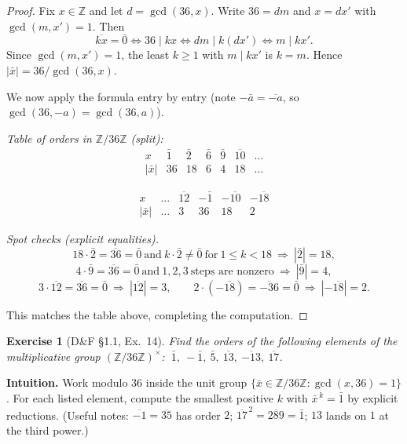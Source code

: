 \documentclass[12pt]{article}
\newtheorem{exercise}[theorem]{Exercise}
\theoremstyle{definition}
\begin{document}
\dotfill

\begin{proof}
Fix $x\in\mathbb{Z}$ and let $d=\gcd(36,x)$. Write $36=dm$ and $x=dx'$ with $\gcd(m,x')=1$.
Then
\[
\overline{kx}=\bar 0 \iff 36\mid kx \iff dm\mid k(dx') \iff m\mid kx'.
\]
Since $\gcd(m,x')=1$, the least $k\ge 1$ with $m\mid kx'$ is $k=m$. Hence $|\bar x|=36/\gcd(36,x)$.

We now apply the formula entry by entry (note $-\bar a=\overline{-a}$, so $\gcd(36,-a)=\gcd(36,a)$).

\dotfill

\noindent\emph{Table of orders in $\mathbb{Z}/36\mathbb{Z}$ (split):}
\[
\begin{array}{c|cccccc}
x & \bar 1 & \bar 2 & \bar 6 & \bar 9 & \overline{10} & \text{...} \\
\hline
|\bar x| & 36 & 18 & 6 & 4 & 18 & \text{...}
\end{array}
\]

\[
\begin{array}{c|ccccc}
x & \text{...} & \overline{12} & -\bar 1 & -\overline{10} & -\overline{18} \\
\hline
|\bar x| & \text{...} & 3 & 36 & 18 & 2
\end{array}
\]

\dotfill

\noindent\emph{Spot checks (explicit equalities).}
\[
18\cdot\bar 2=\overline{36}=\bar 0
\ \text{and}\
k\cdot\bar 2\neq\bar 0\ \text{for}\ 1\le k<18\ \Rightarrow\ |\bar 2|=18,
\]
\[
4\cdot\bar 9=\overline{36}=\bar 0
\ \text{and}\
1,2,3\ \text{steps are nonzero}\ \Rightarrow\ |\bar 9|=4,
\]
\[
3\cdot\overline{12}=\overline{36}=\bar 0\ \Rightarrow\ |\overline{12}|=3,\qquad
2\cdot(-\overline{18})=\overline{-36}=\bar 0\ \Rightarrow\ |-\overline{18}|=2.
\]

This matches the table above, completing the computation.
\end{proof}

\newpage

\begin{exercise}[D\&F §1.1, Ex.~14]
Find the orders of the following elements of the multiplicative group $(\mathbb{Z}/36\mathbb{Z})^{\times}$:
$\ \bar 1,\ -\bar 1,\ \bar 5,\ \overline{13},\ \overline{-13},\ \overline{17}$.
\end{exercise}

\dotfill

\noindent
\textbf{Intuition.}
Work modulo $36$ inside the unit group $\{\bar x\in\mathbb{Z}/36\mathbb{Z}:\gcd(x,36)=1\}$.
For each listed element, compute the smallest positive $k$ with $\bar x^{\,k}=\bar 1$ by explicit reductions.
(Useful notes: $\overline{-1}=\overline{35}$ has order $2$; $\overline{17}^{\,2}=\overline{289}=\bar 1$; $13$ lands on $1$ at the third power.)
\end{document}
